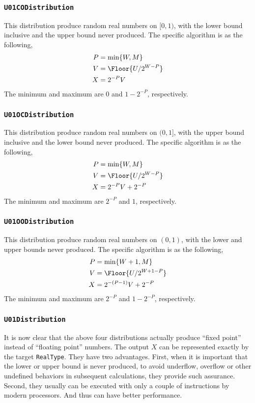 \subsubsection{\texttt{U01CODistribution}}

This distribution produce random real numbers on $[0, 1)$, with the lower bound
inclusive and the upper bound never produced. The specific algorithm is as the
following,
\begin{align*}
  P &= \min\{W, M\} \\
  V &= \Floor{U / 2^{W - P}} \\
  X &= 2^{-P} V
\end{align*}
The minimum and maximum are $0$ and $1 - 2^{-P}$, respectively.

\subsubsection{\texttt{U01OCDistribution}}

This distribution produce random real numbers on $(0, 1]$, with the upper bound
inclusive and the lower bound never produced. The specific algorithm is as the
following,
\begin{align*}
  P &= \min\{W, M\} \\
  V &= \Floor{U / 2^{W - P}} \\
  X &= 2^{-P} V + 2^{-P}
\end{align*}
The minimum and maximum are $2^{-P}$ and $1$, respectively.

\subsubsection{\texttt{U01OODistribution}}

This distribution produce random real numbers on $(0, 1)$, with the lower and
upper bounds never produced. The specific algorithm is as the following,
\begin{align*}
  P &= \min\{W + 1, M\} \\
  V &= \Floor{U / 2^{W + 1 - P}} \\
  X &= 2^{-(P - 1)} V + 2^{-P}
\end{align*}
The minimum and maximum are $2^{-P}$ and $1 - 2^{-P}$, respectively.

\subsubsection{\texttt{U01Distribution}}

It is now clear that the above four distributions actually produce ``fixed
point'' instead of ``floating point'' numbers. The output $X$ can be
represented exactly by the target \verb|RealType|. They have two advantages.
First, when it is important that the lower or upper bound is never produced, to
avoid underflow, overflow or other undefined behaviors in subsequent
calculations, they provide such assurance. Second, they usually can be executed
with only a couple of instructions by modern processors. And thus can have
better performance.

